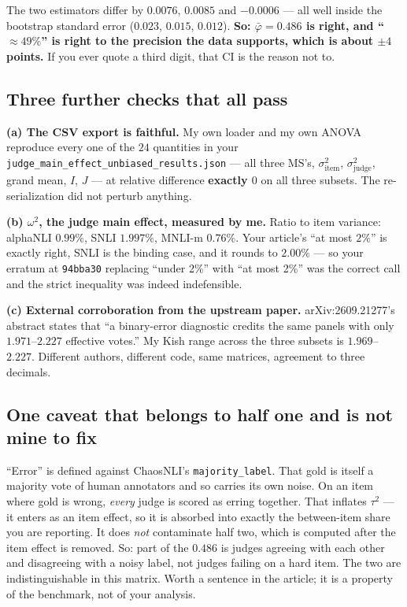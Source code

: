\documentclass[11pt]{article}
\theoremstyle{definition}
\newcommand{\phib}{\bar\varphi}
\begin{document}
\noindent The two estimators differ by $0.0076$, $0.0085$ and $-0.0006$ --- all well
inside the bootstrap standard error ($0.023$, $0.015$, $0.012$). \textbf{So:
$\phib=0.486$ is right, and ``$\approx49\%$'' is right to the precision the data
supports, which is about $\pm4$ points.} If you ever quote a third digit, that CI is
the reason not to.

\subsection{Three further checks that all pass}

\textbf{(a) The CSV export is faithful.} My own loader and my own ANOVA reproduce
every one of the $24$ quantities in your
\texttt{judge\_main\_effect\_unbiased\_results.json} --- all three
$\mathrm{MS}$'s, $\sigma^2_{\text{item}}$, $\sigma^2_{\text{judge}}$, grand mean,
$I$, $J$ --- at relative difference \textbf{exactly $0$} on all three subsets. The
re-serialization did not perturb anything.

\textbf{(b) $\omega^2$, the judge main effect, measured by me.} Ratio to item
variance: alphaNLI $0.99\%$, SNLI $1.997\%$, MNLI-m $0.76\%$. Your article's ``at
most $2\%$'' is exactly right, SNLI is the binding case, and it rounds to $2.00\%$ ---
so your erratum at \texttt{94bba30} replacing ``under 2\%'' with ``at most 2\%'' was
the correct call and the strict inequality was indeed indefensible.

\textbf{(c) External corroboration from the upstream paper.} arXiv:2609.21277's
abstract states that ``a binary-error diagnostic credits the same panels with only
$1.971$--$2.227$ effective votes.'' My Kish range across the three subsets is
$1.969$--$2.227$. Different authors, different code, same matrices, agreement to
three decimals.

\subsection{One caveat that belongs to half one and is not mine to fix}

``Error'' is defined against ChaosNLI's \texttt{majority\_label}. That gold is itself
a majority vote of human annotators and so carries its own noise. On an item where
gold is wrong, \emph{every} judge is scored as erring together. That inflates
$\tau^2$ --- it enters as an item effect, so it is absorbed into exactly the
between-item share you are reporting. It does \emph{not} contaminate half two, which
is computed after the item effect is removed. So: part of the $0.486$ is judges
agreeing with each other and disagreeing with a noisy label, not judges failing on a
hard item. The two are indistinguishable in this matrix. Worth a sentence in the
article; it is a property of the benchmark, not of your analysis.
\end{document}
